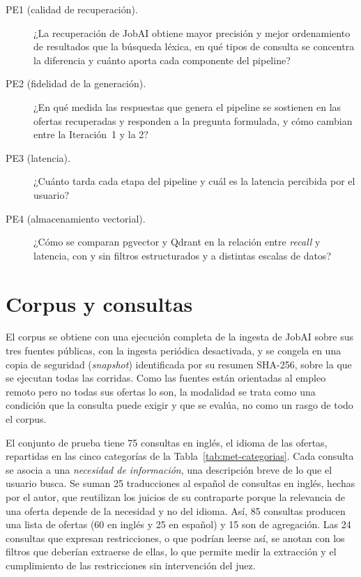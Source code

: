 \begin{description}
    \item[PE1 (calidad de recuperación).] ¿La recuperación de JobAI obtiene mayor precisión y mejor ordenamiento de resultados que la búsqueda léxica, en qué tipos de consulta se concentra la diferencia y cuánto aporta cada componente del pipeline?
    \item[PE2 (fidelidad de la generación).] ¿En qué medida las respuestas que genera el pipeline se sostienen en las ofertas recuperadas y responden a la pregunta formulada, y cómo cambian entre la Iteración~1 y la 2?
    \item[PE3 (latencia).] ¿Cuánto tarda cada etapa del pipeline y cuál es la latencia percibida por el usuario?
    \item[PE4 (almacenamiento vectorial).] ¿Cómo se comparan pgvector y Qdrant en la relación entre \textit{recall} y latencia, con y sin filtros estructurados y a distintas escalas de datos?
\end{description}

\section{Corpus y consultas}
\label{sec:met-corpus}
\label{sec:met-consultas}
\label{sec:met-sistema}

El corpus se obtiene con una ejecución completa de la ingesta de JobAI sobre sus tres fuentes públicas, con la ingesta periódica desactivada, y se congela en una copia de seguridad (\textit{snapshot}) identificada por su resumen SHA-256, sobre la que se ejecutan todas las corridas. Como las fuentes están orientadas al empleo remoto pero no todas sus ofertas lo son, la modalidad se trata como una condición que la consulta puede exigir y que se evalúa, no como un rasgo de todo el corpus.

El conjunto de prueba tiene 75 consultas en inglés, el idioma de las ofertas, repartidas en las cinco categorías de la Tabla~\ref{tab:met-categorias}. Cada consulta se asocia a una \emph{necesidad de información}, una descripción breve de lo que el usuario busca. Se suman 25 traducciones al español de consultas en inglés, hechas por el autor, que reutilizan los juicios de su contraparte porque la relevancia de una oferta depende de la necesidad y no del idioma. Así, 85 consultas producen una lista de ofertas (60 en inglés y 25 en español) y 15 son de agregación. Las 24 consultas que expresan restricciones, o que podrían leerse así, se anotan con los filtros que deberían extraerse de ellas, lo que permite medir la extracción y el cumplimiento de las restricciones sin intervención del juez.

